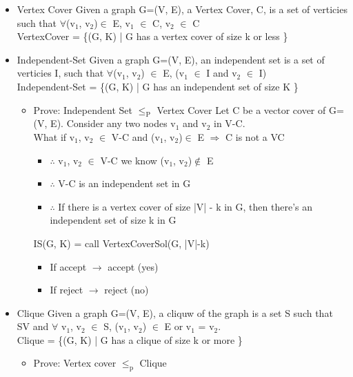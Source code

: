 \documentclass[11pt]{article}
\begin{document}
\begin{itemize}
\item Vertex Cover
Given a graph G=(V, E), a Vertex Cover, C, is a set of verticies such that \(\forall\)(v\(_{\text{1}}\), v\(_{\text{2}}\))\(\in\) E, v\(_{\text{1}}\) \(\in\) C, v\(_{\text{2}}\) \(\in\) C\\
VertexCover = \{(G, K) | G has a vertex cover of size k or less \}
\item Independent-Set
Given a graph G=(V, E), an independent set is a set of verticies I, such that \(\forall\)(v\(_{\text{1}}\), v\(_{\text{2}}\)) \(\in\) E, \textlnot{}(v\(_{\text{1}}\) \(\in\) I and v\(_{\text{2}}\) \(\in\) I)\\
Independent-Set = \{(G, K) | G has an independent set of size K \}
\begin{itemize}
\item Prove: Independent Set \(\le_{\text{P}}\) Vertex Cover
Let C be a vector cover of G=(V, E). Consider any two nodes v\(_{\text{1}}\) and v\(_{\text{2}}\) in V-C.\\
What if v\(_{\text{1}}\), v\(_{\text{2}}\) \(\in\) V-C and (v\(_{\text{1}}\), v\(_{\text{2}}\))\(\in\) E \(\Rightarrow\) C is not a VC
\begin{itemize}
\item \(\therefore\) v\(_{\text{1}}\), v\(_{\text{2}}\) \(\in\) V-C we know (v\(_{\text{1}}\), v\(_{\text{2}}\))\(\notin\) E
\item \(\therefore\) V-C is an independent set in G
\item \(\therefore\) If there is a vertex cover of size |V| - k in G, then there's an independent set of size k in G
\end{itemize}
IS(G, K) = call VertexCoverSol(G, |V|-k)
\begin{itemize}
\item If accept \(\rightarrow\) accept (yes)
\item If reject \(\rightarrow\) reject (no)
\end{itemize}
\end{itemize}
\item Clique
Given a graph G=(V, E), a cliquw of the graph is a set S such that S\subseteq{}V and \(\forall\) v\(_{\text{1}}\), v\(_{\text{2}}\) \(\in\) S, 
(v\(_{\text{1}}\), v\(_{\text{2}}\)) \(\in\) E or v\(_{\text{1}}\) = v\(_{\text{2}}\).\\
Clique = \{(G, K) | G has a clique of size k or more \}
\begin{itemize}
\item Prove: Vertex cover \(\le_{\text{p}}\) Clique

\end{itemize}
\end{itemize}
\end{document}
